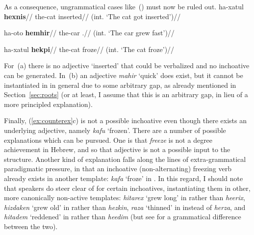 	\ex\label{tree:thif-inch}
	\xe


As a consequence, ungrammatical cases like~(\nextx) must now be ruled out.
\pex\label{ex:counterex}
	\a \ljudge{*}
		\begingl
		\gla ha-xatul \textbf{hexnis}//
		\glb the-cat inserted//
		\glft (int. `The cat got inserted')//
	\endgl
	
	\a \ljudge{*}
		\begingl
		\gla ha-oto \textbf{hemhir}//
		\glb the-car .//
		\glft (int. `The car grew fast')//
	\endgl

	\a \ljudge{*}
		\begingl
		\gla ha-xatul \textbf{hekpi}//
		\glb the-cat froze//
		\glft (int. `The cat froze')//
	\endgl
\xe

For~(\lastx a) there is no adjective `inserted' that could be verbalized and no inchoative can be generated. In~(\lastx b) an adjective \emph{mahir} `quick' does exist, but it cannot be instantiated in {\thif} in general due to some arbitrary gap, as already mentioned in Section~\ref{sec:roots} (or at least, I assume that this is an arbitrary gap, in lieu of a more principled explanation).

Finally, (\ref{ex:counterex}c) is not a possible inchoative even though there exists an underlying adjective, namely \emph{kafu} `frozen'. There are a number of possible explanations which can be pursued. One is that \emph{freeze} is not a degree achievement in Hebrew, and so that adjective is not a possible input to the structure. Another kind of explanation falls along the lines of extra-grammatical paradigmatic pressure, in that an inchoative (non-alternating) freezing verb already exists in another template: \emph{kafa} `froze' in {\tkal}. In this regard, I should note that speakers do steer clear of {\thif} for certain inchoatives, instantiating them in other, more canonically non-active templates: \emph{hitarex} `grew long' in {\thit} rather than \emph{heerix}, \emph{hizdaken} `grew old' in {\thit} rather than \emph{hezkin}, \emph{raza} `thinned' in {\tkal} instead of \emph{herza}, and \emph{hitadem} `reddened' in {\thit} rather than \emph{heedim} (but see \citealt[22]{doron03} for a grammatical difference between the two).

